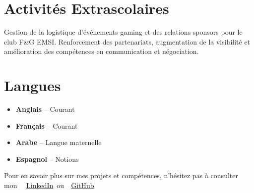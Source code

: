 \documentclass[12pt,a4paper,sans]{moderncv}
\begin{document}
    \section{Activités Extrascolaires}
    Gestion de la logistique d'événements gaming et des relations sponsors pour le club F&G EMSI. Renforcement des partenariats, augmentation de la visibilité et amélioration des compétences en communication et négociation.

    \section{Langues}
    \begin{multicols}{2}
    \begin{itemize}[leftmargin=0.7cm, itemsep=2pt, topsep=2pt]
        \item \textbf{Anglais} – Courant
        \item \textbf{Français} – Courant
        \item \textbf{Arabe} – Langue maternelle
        \item \textbf{Espagnol} – Notions
    \end{itemize}
    \end{multicols}

\vspace{1em}
\begin{center}
    {\footnotesize\color{gray}
    Pour en savoir plus sur mes projets et compétences, n'hésitez pas à consulter mon~
    \faLinkedin~\href{https://www.linkedin.com/in/ahmed-makroum/}{LinkedIn}~ou~\faGithub~\href{https://github.com/ahmedmakroum}{GitHub}.}
\end{center}
\end{document}
